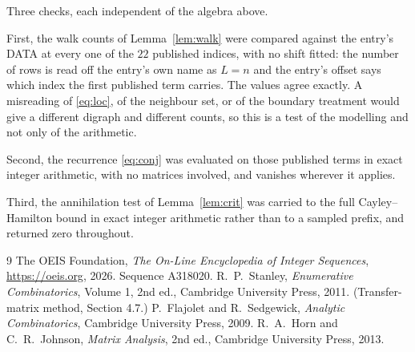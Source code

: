 \documentclass[11pt,a4paper]{article}
\theoremstyle{plain}
\theoremstyle{definition}
\begin{document}
Three checks, each independent of the algebra above.

First, the walk counts of Lemma~\ref{lem:walk} were compared against the entry's DATA at
every one of the $22$ published indices, with no shift fitted: the number of rows is
read off the entry's own name as $L=n$ and the entry's offset says which index the first
published term carries. The values agree exactly. A misreading of \eqref{eq:loc}, of the
neighbour set, or of the boundary treatment would give a different digraph and different
counts, so this is a test of the modelling and not only of the arithmetic.

Second, the recurrence \eqref{eq:conj} was evaluated on those published terms in exact
integer arithmetic, with no matrices involved, and vanishes wherever it applies.

Third, the annihilation test of Lemma~\ref{lem:crit} was carried to the full
Cayley--Hamilton bound in exact integer arithmetic rather than to a sampled prefix, and
returned zero throughout.

\begin{thebibliography}{9}
 The OEIS Foundation, \emph{The On-Line Encyclopedia of Integer
Sequences}, \url{https://oeis.org}, 2026. Sequence A318020.
 R.~P.~Stanley, \emph{Enumerative Combinatorics}, Volume 1, 2nd ed.,
Cambridge University Press, 2011. (Transfer-matrix method, Section 4.7.)
 P.~Flajolet and R.~Sedgewick, \emph{Analytic Combinatorics}, Cambridge
University Press, 2009.
 R.~A.~Horn and C.~R.~Johnson, \emph{Matrix Analysis}, 2nd ed., Cambridge
University Press, 2013.
\end{thebibliography}
\end{document}
